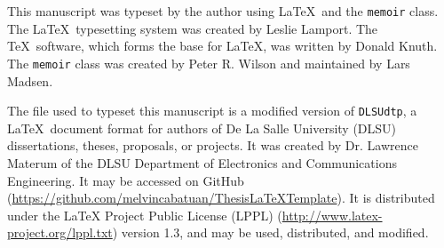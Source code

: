 This manuscript was typeset by the author using \LaTeX\  and the \texttt{memoir} class.
The \LaTeX\ typesetting system was created by Leslie Lamport.
The \TeX\ software, which forms the base for \LaTeX, was written by Donald Knuth.
The \texttt{memoir} class was created by Peter R. Wilson and maintained by Lars Madsen.

The file used to typeset this manuscript is a modified version of \texttt{DLSUdtp}, a \LaTeX\  document format for authors of De La Salle University (DLSU) dissertations, theses, proposals, or projects.
It was created by Dr. Lawrence Materum of the DLSU Department of Electronics and Communications Engineering.
It may be accessed on GitHub (\url{https://github.com/melvincabatuan/ThesisLaTeXTemplate}).
It is distributed under the LaTeX Project Public License (LPPL) (\url{http://www.latex-project.org/lppl.txt}) version 1.3, and may be used, distributed, and modified. 